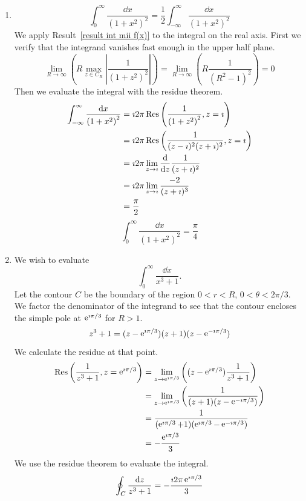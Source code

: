 {%
\begin{Solution}
  \label{solution 1/(x^3+1)}
  \begin{enumerate}
  \item
    \[
    \int_0^\infty \frac{\dd x}{ \left(1 + x^2 \right)^2 }
    = \frac{1}{2} \int_{-\infty}^\infty \frac{\dd x}{ \left(1 + x^2 \right)^2 }
    \]
    We apply Result~\ref{result int mii f(x)} to the integral on the real axis.
    First we verify that the integrand vanishes fast enough in the upper half 
    plane.
    \[
    \lim_{R \to \infty} \left( R \max_{z \in C_R} \left| \frac{1}{ \left( 1 + z^2 \right)^2 }
      \right| \right) 
    = \lim_{R \to \infty} \left( R \frac{1}{ \left( R^2 - 1 \right)^2 } \right)
    = 0
    \]
    Then we evaluate the integral with the residue theorem.
    \begin{align*}
      \int_{-\infty}^\infty \frac{\mathrm{d} x}{ \left(1 + x^2 \right)^2 }
      &= \imath 2 \pi \mathop{\mathrm{Res}}\nolimits \left( \frac{1}{ \left( 1 + z^2 \right)^2 }, z = \imath \right) \\
      &= \imath 2 \pi \mathop{\mathrm{Res}}\nolimits \left( \frac{1}{ (z - \imath)^2 (z + \imath)^2 }, z = \imath \right) \\
      &= \imath 2 \pi \lim_{z \to \imath} \frac{\mathrm{d}}{\mathrm{d} z} \frac{1}{(z + \imath)^2} \\
      &= \imath 2 \pi \lim_{z \to \imath} \frac{-2}{(z + \imath)^3} \\
      &= \frac{\pi}{2}
    \end{align*}
    \[
    \boxed{
      \int_0^\infty \frac{\dd x}{ \left(1 + x^2 \right)^2 } = \frac{\pi}{4}
      }
    \]
  \item
    We wish to evaluate
    \[
    \int_0^\infty \frac{\dd x}{x^3 + 1}.
    \]
    Let the contour $C$ be the boundary of the region 
    $0 < r < R$, $0 < \theta < 2 \pi / 3$.
    We factor the denominator of the integrand to see that the contour 
    encloses the simple pole at $\mathop{\mathrm{e}}\nolimits^{\imath \pi / 3}$ for $R > 1$.
    \[
    z^3 + 1 = (z - \mathop{\mathrm{e}}\nolimits^{\imath \pi / 3}) (z + 1) (z - \mathop{\mathrm{e}}\nolimits^{- \imath \pi / 3})
    \]
    We calculate the residue at that point.
    \begin{align*}
      \mathop{\mathrm{Res}}\nolimits \left( \frac{1}{z^3 + 1}, z = \mathop{\mathrm{e}}\nolimits^{\imath \pi / 3} \right)
      &= \lim_{z \to \mathop{\mathrm{e}}\nolimits^{\imath \pi/3}} \left( (z - \mathop{\mathrm{e}}\nolimits^{\imath \pi/3}) \frac{1}{z^3 + 1} \right) 
      \\
      &= \lim_{z \to \mathop{\mathrm{e}}\nolimits^{\imath \pi/3}} \left( \frac{1}{(z + 1) (z- \mathop{\mathrm{e}}\nolimits^{- \imath \pi / 3})} \right)
      \\
      &= \frac{1}{(\mathop{\mathrm{e}}\nolimits^{\imath \pi/3} + 1) (\mathop{\mathrm{e}}\nolimits^{\imath \pi/3} - \mathop{\mathrm{e}}\nolimits^{- \imath \pi / 3})}
      \\
      &= - \frac{ \mathop{\mathrm{e}}\nolimits^{\imath \pi/3} }{ 3 }
    \end{align*}
    We use the residue theorem to evaluate the integral.
    \[
    \oint_C \frac{\mathrm{d} z}{z^3 + 1} = - \frac{ \imath 2 \pi \mathop{\mathrm{e}}\nolimits^{\imath \pi/3} }{ 3 }
    \]


\end{enumerate}
\end{Solution}}
